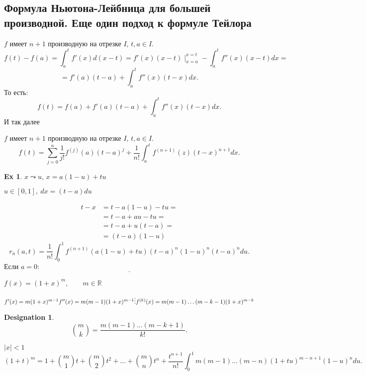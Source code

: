\documentclass[11pt]{book}
\newcommand{\R}{\mathbb{R}}
\theoremstyle{definition}
\theoremstyle{plain}
\theoremstyle{plain}
\theoremstyle{definition}
\newtheorem*{ex}{Ex}
\newtheorem*{name}{Designation}
\theoremstyle{remark}
\begin{document}
\subsection{Формула Ньютона-Лейбница для большей производной. Еще один подход к формуле Тейлора}
$ f$ имеет $ n+1$ производную на отрезке  $ I$,  $ t, a \in I$.
\[
    f(t) - f(a) = \int_a^{t} f'(x)d(x-t) = f'(x) (x-t) \mid_{x=a}^{x=t} - \int_a^{t} f''(x)(x-t) dx =
\]
\[
    =f'(a) (t-a) +\int_a^{t}f''(x) (t-x) dx
.\]
То есть:
\[
    f(t) = f(a) + f'(a)(t-a) + \int_a^{t} f''(x) (t-x) dx
.\]
И так далее
\begin{thm}
    $ f$ имеет $ n+1$ производную на отрезке  $ I$,  $ t, a \in I$.
    \[
	f(t) = \sum_{j=0}^{n} \frac{1}{j!} f^{(j)} (a) (t-a)^{j}+ \frac{1}{n!} \int_{a}^{t} f^{(n+1)} (z) (t -x)^{n+1} dx
    .\]
\end{thm}
\begin{ex}
    $ x \leadsto  u$, $ x = a(1-u) +tu$

    $ u \in  [0, 1], ~ dx = (t-a) du$

    \begin{align*}
	t-x &= t -a(1-u) -tu = \\
	    &=t-a + au - tu =\\
	    &=t-a + u(t-a) =\\
	    &=(t-a)(1-u)
    \end{align*}
    \[
	r_n(a, t) = \frac{1}{n!} \int_{0}^{1} f^{(n+1)} (a(1-u) + tu)(t-a)^{n}(1-u)^{n}(t-a)^{n}du
    .\]
    Если $ a = 0$:
    \[
    .\]
\end{ex}
$ f(x) = (1+x)^{m}, \qquad m \in \R $

$ f'(x) = m(1+x)^{m-1} \\
f''(x) = m(m-1)(1+x)^{m-1} \\
\vdots \\
f^{(k)}(x) = m(m-1) \ldots (m-k-1) (1+x) ^{m-k}
$
\begin{name}
    \[
	{m \choose k} = \frac{m (m-1) \ldots  (m-k+1)}{k!}
    .\]
\end{name}

$ |x| < 1$
\[
    (1+t)^{m} = 1 + {m \choose 1} t + {m \choose 2} t^2 + \ldots  + {m \choose n} t ^{n} + \frac{t ^{n+1}}{n!} \int_0^{1} m (m-1) \ldots  (m-n) (1 + tu) ^{m-n+1} (1-u)^{n} du
.\]
\end{document}
